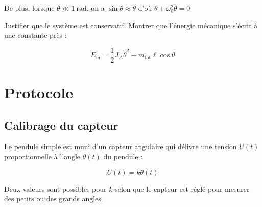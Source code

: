 \documentclass[a4paper,french,bookmarks]{article}
\begin{document}
\begin{enumerate}
{        De plus, lorsque $\theta \ll \SI{1}{\radian}$, on a $\sin \theta \approx \theta$ d'où $\boxed{\ddot\theta + \omega_0^2\theta = 0}$
    }
    
    Justifier que le système est conservatif. Montrer que l'énergie mécanique s'écrit à une constante près :
    
    \begin{equation}
        \boxed{E_\text{m} = \dfrac{1}{2}J_\Delta \dot \theta^2 - m_\text{tot}\ell\cos\theta}
    \end{equation}
    
    
\end{enumerate}

\section{Protocole}

\subsection{Calibrage du capteur}

Le pendule simple est muni d'un capteur angulaire qui délivre une tension $U(t)$ proportionnelle à l'angle $\theta(t)$ du pendule :

\begin{equation}
    U(t) = k\theta(t)
\end{equation}

Deux valeurs sont possibles pour $k$ selon que le capteur est réglé pour mesurer des petits ou des grands angles.
\end{document}

